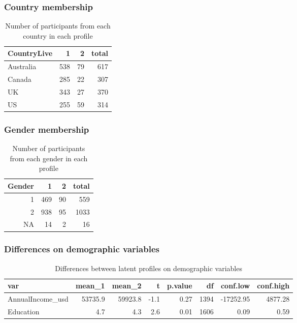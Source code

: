 \documentclass[]{article}
\begin{document}
\hypertarget{country-membership}{%
\subsubsection{Country membership}\label{country-membership}}

\begin{table}[H]

\caption{\label{tab:unnamed-chunk-7}Number of participants from each country in each profile}
\centering
\fontsize{6}{8}\selectfont
\begin{tabular}[t]{lrrr}
\toprule
CountryLive & 1 & 2 & total\\
\midrule
Australia & 538 & 79 & 617\\
Canada & 285 & 22 & 307\\
UK & 343 & 27 & 370\\
US & 255 & 59 & 314\\
\bottomrule
\end{tabular}
\end{table}

\hypertarget{gender-membership}{%
\subsubsection{Gender membership}\label{gender-membership}}

\begin{table}[H]

\caption{\label{tab:unnamed-chunk-8}Number of participants from each gender in each profile}
\centering
\fontsize{6}{8}\selectfont
\begin{tabular}[t]{rrrr}
\toprule
Gender & 1 & 2 & total\\
\midrule
1 & 469 & 90 & 559\\
2 & 938 & 95 & 1033\\
NA & 14 & 2 & 16\\
\bottomrule
\end{tabular}
\end{table}

\hypertarget{differences-on-demographic-variables}{%
\subsubsection{Differences on demographic
variables}\label{differences-on-demographic-variables}}

\begin{table}[H]

\caption{\label{tab:unnamed-chunk-9}Differences between latent profiles on demographic variables}
\centering
\fontsize{6}{8}\selectfont
\begin{tabular}[t]{lrrrrrrr}
\toprule
var & mean\_1 & mean\_2 & t & p.value & df & conf.low & conf.high\\
\midrule
AnnualIncome\_usd & 53735.9 & 59923.8 & -1.1 & 0.27 & 1394 & -17252.95 & 4877.28\\
Education & 4.7 & 4.3 & 2.6 & 0.01 & 1606 & 0.09 & 0.59\\
\bottomrule
\end{tabular}
\end{table}
\end{document}
